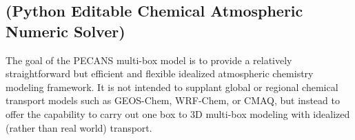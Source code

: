 \subsection*{(Python Editable Chemical Atmospheric Numeric Solver)}

The goal of the P\+E\+C\+A\+NS multi-\/box model is to provide a relatively straightforward but efficient and flexible idealized atmospheric chemistry modeling framework. It is not intended to supplant global or regional chemical transport models such as G\+E\+O\+S-\/\+Chem, W\+R\+F-\/\+Chem, or C\+M\+AQ, but instead to offer the capability to carry out one box to 3D multi-\/box modeling with idealized (rather than real world) transport. 